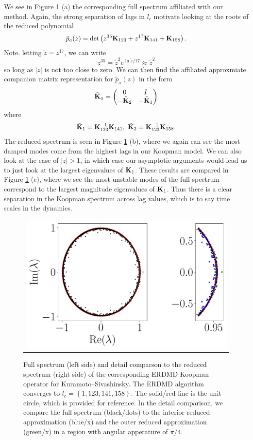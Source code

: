 \documentclass[a4paper,11pt]{article}
\begin{document}
We see in Figure \ref{fig:ksspectrum} (a) the corresponding full spectrum affiliated with our method.  Again, the strong separation of lags in $l_{c}$ motivate looking at the roots of the reduced polynomial
\[
\tilde{p}_{a}(z) = \text{det}\left(z^{35}{\bf K}_{123} + z^{17}{\bf K}_{141} + {\bf K}_{158} \right).
\] 
Note, letting $\tilde{z}=z^{17}$, we can write 
\[
z^{35} = \tilde{z}^{2}e^{\ln \tilde{z}/17} \approx \tilde{z}^{2}
\]
so long as $|z|$ is not too close to zero.  We can then find the affiliated approxmiate companion matrix representation for $\tilde{p}_{a}(z)$ in the form
\[
\tilde{{\bf K}}_{a} = 
\begin{pmatrix} 
0 & I \\ 
-\tilde{{\bf K}}_{2} & -\tilde{{\bf K}}_{1} \\
\end{pmatrix}
\]
where 
\[
\tilde{{\bf K}}_{1} = {\bf K}_{123}^{-1}{\bf K}_{141}, ~ \tilde{{\bf K}}_{2} = {\bf K}_{123}^{-1}{\bf K}_{158}.
\]
The reduced spectrum is seen in Figure \ref{fig:ksspectrum} (b), where we again can see the most damped modes come from the highest lags in our Koopman model.  We can also look at the case of $|z|>1$, in which case our asymptotic arguments would lead us to just look at the largest eigenvalues of ${\bf K}_{1}$.  These results are compared in Figure \ref{fig:ksspectrum} (c), where we see the most unstable modes of the full spectrum correspond to the largest magnitude eigenvalues of ${\bf K}_{1}$.  Thus there is a clear separation in the Koopman spectrum across lag values, which is to say time scales in the dynamics.     
\begin{figure}[!h]
\centering
\begin{tabular}{c}
\includegraphics[width=1\textwidth]{Kuramoto_detail_spectrum_w_mx_lag_158} \end{tabular}
\caption{Full spectrum (left side) and detail comparson to the reduced spectrum (right side) of the corresponding ERDMD Koopman operator for Kuramoto--Sivashinsky.  The ERDMD algorithm converges to $l_{c}=\left\{1, 123, 141, 158\right\}$.  The solid/red line is the unit circle, which is provided for reference. In the detail comparison, we compare the full spectrum (black/dots) to the interior reduced approximation (blue/x) and the outer reduced approximation (green/x) in a region with angular apperature of $\pi/4$.}
\label{fig:ksspectrum}
\end{figure}
\end{document}
